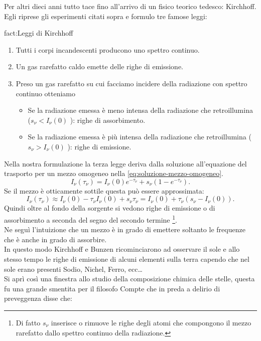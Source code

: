 Per altri dieci anni tutto tace fino all'arrivo di un fisico teorico tedesco: Kirchhoff. Egli riprese gli esperimenti citati sopra e formulo tre famose leggi: 
\begin{fact}{fact:Leggi di Kirchhoff}
	\begin{enumerate}
		\item Tutti i corpi incandescenti producono uno spettro continuo.
		\item Un gas rarefatto caldo emette delle righe di emissione.
		\item Preso un gas rarefatto su cui facciamo incidere della radiazione con spettro continuo otteniamo 
			\begin{itemize}
				\item Se la radiazione emessa è meno intensa della radiazione che retroillumina ($s_{\nu} < I_{\nu} ( 0) $ ): righe di assorbimento.
				\item Se la radiazione emessa è più intensa della radiazione che retroillumina ($s_{\nu} > I_{\nu} ( 0) $ ): righe di emissione.
			\end{itemize}
	\end{enumerate}
\end{fact}
Nella nostra formulazione la terza legge deriva dalla soluzione all'equazione del trasporto per un mezzo omogeneo nella \ref{eq:soluzione-mezzo-omogeneo}.
\[
	I_{\nu} ( \tau _{\nu} ) = I_{\nu} ( 0)e^{-\tau _{\nu} } + s_{\nu} \left( 1-e^{-\tau _{\nu} } \right) 
.\] 
Se il mezzo è otticamente sottile questa può essere approssimata:
\[
	I_{\nu} ( \tau _{\nu} ) \approx I_{\nu} ( 0) -\tau _{\nu} I_{\nu} ( 0)  + s_{\nu} \tau _{\nu} = I_{\nu} ( 0) + \tau _{\nu} ( s_{\nu} -I_{\nu} ( 0) ) 
.\] 
Quindi oltre al fondo della sorgente si vedono righe di emissione o di assorbimento a seconda del segno del secondo termine \footnote{Di fatto $s_{\nu} $ inserisce o rimuove le righe degli atomi che compongono il mezzo rarefatto dallo spettro continuo della radiazione.}. \\
Ne seguì l'intuizione che un mezzo è in grado di emettere soltanto le frequenze che è anche in grado di assorbire.\\
In questo modo Kirchhoff e Bunzen ricominciarono ad osservare il sole e allo stesso tempo le righe di emissione di alcuni elementi sulla terra capendo che nel sole erano presenti Sodio, Nichel, Ferro, ecc\ldots\\
Si aprì così una finestra allo studio della composizione chimica delle stelle, questa fu una grande smentita per il filosofo Compte che in preda a delirio di preveggenza disse che:
